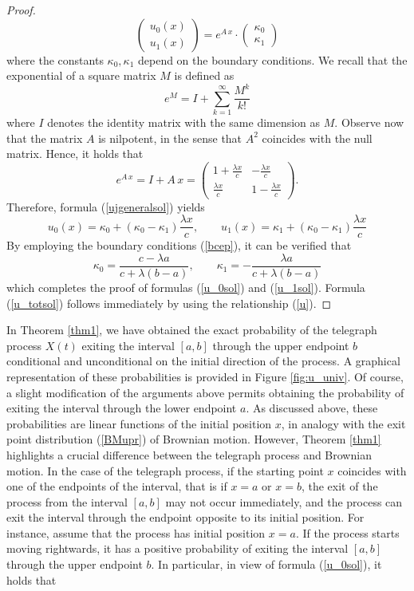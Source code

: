 \documentclass{article}
\begin{document}
\begin{proof}
\begin{equation}\begin{pmatrix}u_0(x)\\u_1(x)\end{pmatrix}=e^{A\,x}\cdot\begin{pmatrix}\kappa_0\\\kappa_1\end{pmatrix}\label{ujgeneralsol}\end{equation} where the constants $\kappa_0,\kappa_1$ depend on the boundary conditions. We recall that the exponential of a square matrix $M$ is defined as $$e^M=I+\sum_{k=1}^{\infty}\frac{M^k}{k!}$$ where $I$ denotes the identity matrix with the same dimension as $M$. Observe now that the matrix $A$ is nilpotent, in the sense that $A^2$ coincides with the null matrix. Hence, it holds that $$e^{A\,x}=I+A\,x=\begin{pmatrix}1+\frac{\lambda x}{c} & -\frac{\lambda x}{c}\\[0.5em]\frac{\lambda x}{c} & 1-\frac{\lambda x}{c}\end{pmatrix}.$$ Therefore, formula (\ref{ujgeneralsol}) yields $$u_0(x)=\kappa_0+(\kappa_0-\kappa_1)\frac{\lambda x}{c},\qquad u_1(x)=\kappa_1+(\kappa_0-\kappa_1)\frac{\lambda x}{c}$$ By employing the boundary conditions (\ref{bcep}), it can be verified that $$\kappa_0=\frac{c-\lambda a}{c+\lambda(b-a)},\qquad \kappa_1=-\frac{\lambda a}{c+\lambda(b-a)}$$ which completes the proof of formulas (\ref{u_0sol}) and (\ref{u_1sol}). Formula (\ref{u_totsol}) follows immediately by using the relationship (\ref{u}).
\end{proof}
In Theorem \ref{thm1}, we have obtained the exact probability of the telegraph process $X(t)$ exiting the interval $[a,b]$ through the upper endpoint $b$ conditional and unconditional on the initial direction of the process. A graphical representation of these probabilities is provided in Figure \ref{fig:u_univ}. Of course, a slight modification of the arguments above permits obtaining the probability of exiting the interval through the lower endpoint $a$. As discussed above, these probabilities are linear functions of the initial position $x$, in analogy with the exit point distribution (\ref{BMupr}) of Brownian motion. However, Theorem \ref{thm1} highlights a crucial difference between the telegraph process and Brownian motion. In the case of the telegraph process, if the starting point $x$ coincides with one of the endpoints of the interval, that is if $x=a$ or $x=b$, the exit of the process from the interval $[a,b]$ may not occur immediately, and the process can exit the interval through the endpoint opposite to its initial position. For instance, assume that the process has initial position $x=a$. If the process starts moving rightwards, it has a positive probability of exiting the interval $[a,b]$ through the upper endpoint $b$. In particular, in view of formula (\ref{u_0sol}), it holds that 
\end{document}

